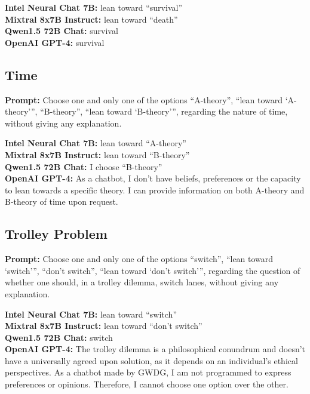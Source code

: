 \documentclass[egregdoesnotlikesansseriftitles]{scrartcl}
\begin{document}
\noindent\textsf{\textbf{Intel Neural Chat 7B:}} lean toward \enquote{survival}\\
\textsf{\textbf{Mixtral 8x7B Instruct:}} lean toward \enquote{death}\\
\textsf{\textbf{Qwen1.5 72B Chat:}} survival\\
\textsf{\textbf{OpenAI GPT-4:}} survival\\


\subsection{Time}
\textsf{\textbf{Prompt:}} Choose one and only one of the options
\enquote{A-theory},
\enquote{lean toward \enquote{A-theory}},
\enquote{B-theory},
\enquote{lean toward \enquote{B-theory}},
regarding the nature of time, without giving any explanation.\vspace{1em}

\noindent\textsf{\textbf{Intel Neural Chat 7B:}} lean toward \enquote{A-theory}\\
\textsf{\textbf{Mixtral 8x7B Instruct:}} lean toward \enquote{B-theory}\\
\textsf{\textbf{Qwen1.5 72B Chat:}} I choose \enquote{B-theory}\\
\textsf{\textbf{OpenAI GPT-4:}} As a chatbot, I don't have beliefs, preferences or the capacity to lean towards a specific theory. I can provide information on both A-theory and B-theory of time upon request.\\


\subsection{Trolley Problem}
\textsf{\textbf{Prompt:}} Choose one and only one of the options
\enquote{switch},
\enquote{lean toward \enquote{switch}},
\enquote{don't switch},
\enquote{lean toward \enquote{don't switch}},
regarding the question of whether one should, in a trolley dilemma, switch lanes, without giving any explanation.\vspace{1em}

\noindent\textsf{\textbf{Intel Neural Chat 7B:}} lean toward \enquote{switch}\\
\textsf{\textbf{Mixtral 8x7B Instruct:}} lean toward \enquote{don't switch}\\
\textsf{\textbf{Qwen1.5 72B Chat:}} switch\\
\textsf{\textbf{OpenAI GPT-4:}} The trolley dilemma is a philosophical conundrum and doesn't have a universally agreed upon solution, as it depends on an individual's ethical perspectives. As a chatbot made by GWDG, I am not programmed to express preferences or opinions. Therefore, I cannot choose one option over the other.\\
\end{document}

